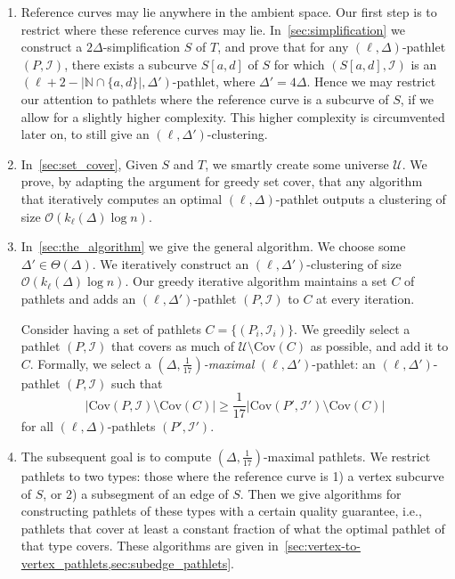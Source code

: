 \documentclass[a4paper,UKenglish,cleveref,thm-restate,notab]{lipics-v2021}
\newcommand{\bigO}{\mathcal{O}}
\newcommand{\N}{\mathbb{N}}
\newcommand{\I}{\mathcal{I}}
\newcommand{\U}{\mathcal{U}}
\newcommand{\Cov}{\ensuremath{\mathrm{Cov}}}
\begin{document}
    \begin{enumerate}
        \item Reference curves may lie anywhere in the ambient space.
        Our first step is to restrict where these reference curves may lie.
        In~\cref{sec:simplification} we construct a $2\Delta$-simplification $S$ of $T$, and prove that for any $(\ell, \Delta)$-pathlet $(P, \I)$, there exists a subcurve $S[a, d]$ of $S$ for which $(S[a, d], \I)$ is an $(\ell+2-|\N \cap \{a, d\}|, \Delta')$-pathlet, where $\Delta' = 4\Delta$.
        Hence we may restrict our attention to pathlets where the reference curve is a subcurve of $S$, if we allow for a slightly higher complexity.
        This higher complexity is circumvented later on, to still give an $(\ell, \Delta')$-clustering.
        \item  In~\cref{sec:set_cover}, Given $S$ and $T$, we smartly create some universe $\U$. We prove, by adapting the argument for greedy set cover, that any algorithm that iteratively computes an optimal $(\ell, \Delta)$-pathlet outputs a clustering of size $\bigO(k_{\ell}(\Delta) \log n)$.
        \item In~\cref{sec:the_algorithm} we give the general algorithm.
        We choose some $\Delta' \in \Theta(\Delta)$. We iteratively construct an $(\ell, \Delta')$-clustering of size $\bigO(k_{\ell}(\Delta) \log n)$.
        Our greedy iterative algorithm maintains a set $C$ of pathlets and adds an $(\ell, \Delta')$-pathlet $(P, \I)$ to $C$ at every iteration.
        
        Consider having a set of pathlets $C = \{ (P_i, \I_i) \}$.
        We greedily select a pathlet $(P, \I)$ that covers as much of $\U \setminus \Cov(C)$ as possible, and add it to $C$. 
        Formally, we select a \emph{$(\Delta, \frac{1}{17})$-maximal} $(\ell, \Delta')$-pathlet: an $(\ell, \Delta')$-pathlet $(P, \I)$ such that
        \[
        | \Cov(P, \I) \setminus \Cov(C) | \geq \frac{1}{17} | \Cov(P', \I') \setminus \Cov(C) |
        \]
        for all $(\ell, \Delta)$-pathlets $(P', \I')$.        
        \item The subsequent goal is to compute $(\Delta, \frac{1}{17})$-maximal pathlets.
        We restrict pathlets to two types: those where the reference curve is 1) a vertex subcurve of $S$, or 2) a subsegment of an edge of $S$.
        Then we give algorithms for constructing pathlets of these types with a certain quality guarantee, i.e., pathlets that cover at least a constant fraction of what the optimal pathlet of that type covers.
        These algorithms are given in~\cref{sec:vertex-to-vertex_pathlets,sec:subedge_pathlets}.
    \end{enumerate}
\end{document}
